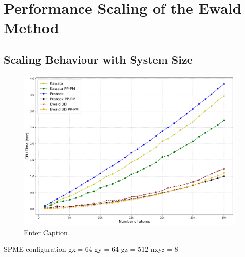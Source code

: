 \section{Performance Scaling of the Ewald Method}
\subsection{Scaling Behaviour with System Size}
\begin{figure}[H]
    \centering
    \includegraphics[width=\linewidth]{images/Result30k.jpg}
    \caption{Enter Caption}
    \label{fig:enter-label}
\end{figure}
SPME configuration
gx = 64 
gy = 64
gz = 512
nxyz = 8

